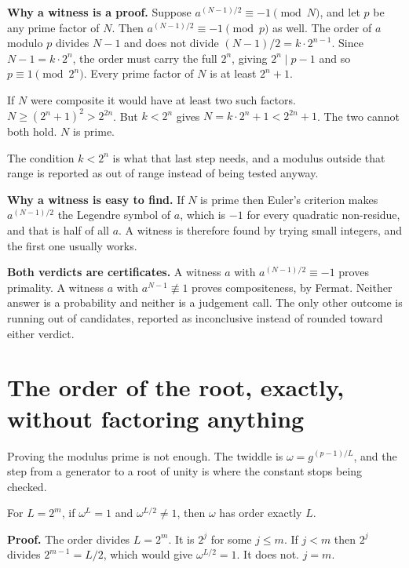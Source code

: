 \textbf{Why a witness is a proof.} Suppose \(a^{(N-1)/2} \equiv -1 \pmod N\), and let \(p\) be any prime factor of \(N\). Then \(a^{(N-1)/2} \equiv -1 \pmod p\) as well. The order of \(a\) modulo \(p\) divides \(N-1\) and does not divide \((N-1)/2 = k \cdot 2^{n-1}\). Since \(N - 1 = k \cdot 2^n\), the order must carry the full \(2^n\), giving \(2^n \mid p-1\) and so \(p \equiv 1 \pmod{2^n}\). Every prime factor of \(N\) is at least \(2^n + 1\).

If \(N\) were composite it would have at least two such factors. \(N \ge (2^n+1)^2 > 2^{2n}\). But \(k < 2^n\) gives \(N = k \cdot 2^n + 1 < 2^{2n} + 1\). The two cannot both hold. \(N\) is prime. \qedsymbol

The condition \(k < 2^n\) is what that last step needs, and a modulus outside that range is reported as out of range instead of being tested anyway.

\textbf{Why a witness is easy to find.} If \(N\) is prime then Euler's criterion makes \(a^{(N-1)/2}\) the Legendre symbol of \(a\), which is \(-1\) for every quadratic non-residue, and that is half of all \(a\). A witness is therefore found by trying small integers, and the first one usually works.

\textbf{Both verdicts are certificates.} A witness \(a\) with \(a^{(N-1)/2} \equiv -1\) proves primality. A witness \(a\) with \(a^{N-1} \not\equiv 1\) proves compositeness, by Fermat. Neither answer is a probability and neither is a judgement call. The only other outcome is running out of candidates, reported as inconclusive instead of rounded toward either verdict.

\section{The order of the root, exactly, without factoring anything}

Proving the modulus prime is not enough. The twiddle is \(\omega = g^{(p-1)/L}\), and the step from a generator to a root of unity is where the constant stops being checked.

\begin{proposition}
For \(L = 2^m\), if \(\omega^L = 1\) and \(\omega^{L/2} \ne 1\), then \(\omega\) has order exactly \(L\).
\end{proposition}

\textbf{Proof.} The order divides \(L = 2^m\). It is \(2^j\) for some \(j \le m\). If \(j < m\) then \(2^j\) divides \(2^{m-1} = L/2\), which would give \(\omega^{L/2} = 1\). It does not. \(j = m\). \qedsymbol

